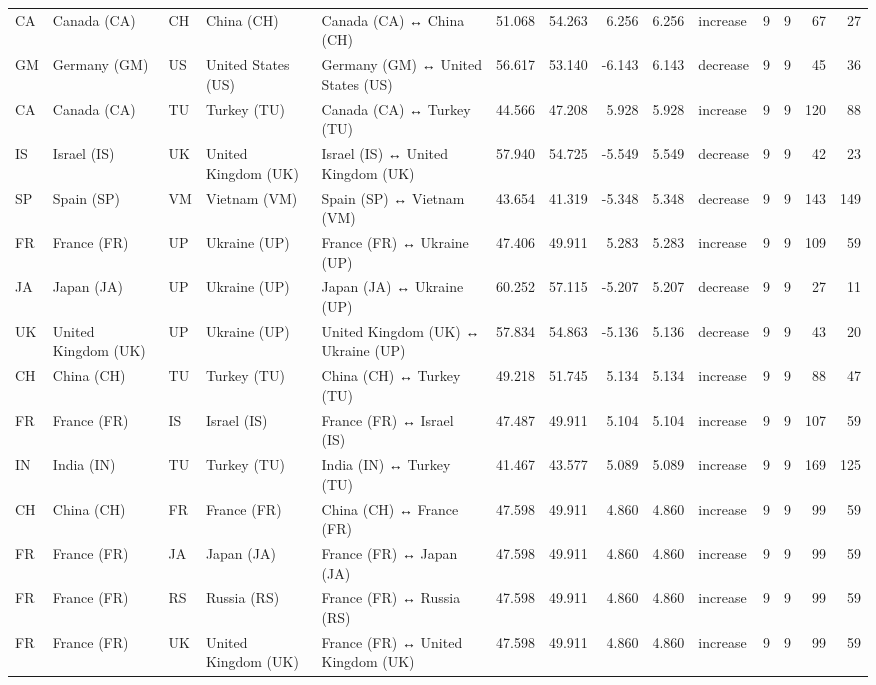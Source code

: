 \begin{tabular}{lllllrrrrlrrrr}
CA & Canada (CA) & CH & China (CH) & Canada (CA) ↔ China (CH) & 51.068 & 54.263 & 6.256 & 6.256 & increase & 9 & 9 & 67 & 27 \\
GM & Germany (GM) & US & United States (US) & Germany (GM) ↔ United States (US) & 56.617 & 53.140 & -6.143 & 6.143 & decrease & 9 & 9 & 45 & 36 \\
CA & Canada (CA) & TU & Turkey (TU) & Canada (CA) ↔ Turkey (TU) & 44.566 & 47.208 & 5.928 & 5.928 & increase & 9 & 9 & 120 & 88 \\
IS & Israel (IS) & UK & United Kingdom (UK) & Israel (IS) ↔ United Kingdom (UK) & 57.940 & 54.725 & -5.549 & 5.549 & decrease & 9 & 9 & 42 & 23 \\
SP & Spain (SP) & VM & Vietnam (VM) & Spain (SP) ↔ Vietnam (VM) & 43.654 & 41.319 & -5.348 & 5.348 & decrease & 9 & 9 & 143 & 149 \\
FR & France (FR) & UP & Ukraine (UP) & France (FR) ↔ Ukraine (UP) & 47.406 & 49.911 & 5.283 & 5.283 & increase & 9 & 9 & 109 & 59 \\
JA & Japan (JA) & UP & Ukraine (UP) & Japan (JA) ↔ Ukraine (UP) & 60.252 & 57.115 & -5.207 & 5.207 & decrease & 9 & 9 & 27 & 11 \\
UK & United Kingdom (UK) & UP & Ukraine (UP) & United Kingdom (UK) ↔ Ukraine (UP) & 57.834 & 54.863 & -5.136 & 5.136 & decrease & 9 & 9 & 43 & 20 \\
CH & China (CH) & TU & Turkey (TU) & China (CH) ↔ Turkey (TU) & 49.218 & 51.745 & 5.134 & 5.134 & increase & 9 & 9 & 88 & 47 \\
FR & France (FR) & IS & Israel (IS) & France (FR) ↔ Israel (IS) & 47.487 & 49.911 & 5.104 & 5.104 & increase & 9 & 9 & 107 & 59 \\
IN & India (IN) & TU & Turkey (TU) & India (IN) ↔ Turkey (TU) & 41.467 & 43.577 & 5.089 & 5.089 & increase & 9 & 9 & 169 & 125 \\
CH & China (CH) & FR & France (FR) & China (CH) ↔ France (FR) & 47.598 & 49.911 & 4.860 & 4.860 & increase & 9 & 9 & 99 & 59 \\
FR & France (FR) & JA & Japan (JA) & France (FR) ↔ Japan (JA) & 47.598 & 49.911 & 4.860 & 4.860 & increase & 9 & 9 & 99 & 59 \\
FR & France (FR) & RS & Russia (RS) & France (FR) ↔ Russia (RS) & 47.598 & 49.911 & 4.860 & 4.860 & increase & 9 & 9 & 99 & 59 \\
FR & France (FR) & UK & United Kingdom (UK) & France (FR) ↔ United Kingdom (UK) & 47.598 & 49.911 & 4.860 & 4.860 & increase & 9 & 9 & 99 & 59 \\

\end{tabular}

